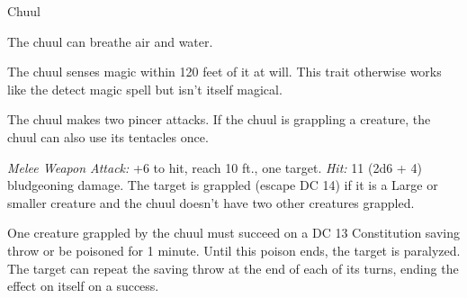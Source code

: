\documentclass[10pt,a4paper,twoside,bg=none,twocolumn,openany,nodeprecatedcode]{dndbook}
\begin{document}
\begin{DndMonster}[float=t]{Chuul}
\DndMonsterBasics[
armor-class = {16 (natural armor)},
hit-points = {\DndDice{11d10 + 33}},
speed = {30 ft., swim 30 ft.}
]
\DndMonsterAbilityScores[
 str = 19,
 dex = 10,
 con = 16,
 int = 5,
 wis = 11,
 cha = 5
]
\DndMonsterDetails[
skills = {Perception +4},
damage-immunities = {poison},
senses = {darkvision 60 ft., passive perception 14},
languages = {understands Deep Speech but can't speak},
challenge = 4,
]
The chuul can breathe air and water.

The chuul senses magic within 120 feet of it at will. This trait otherwise works like the detect magic spell but isn't itself magical.

\par
{}
The chuul makes two pincer attacks. If the chuul is grappling a creature, the chuul can also use its tentacles once.

\textsl{Melee Weapon Attack:} +6 to hit, reach 10 ft., one target. \textsl{Hit:} 11 (2d6 + 4) bludgeoning damage. The target is grappled (escape DC 14) if it is a Large or smaller creature and the chuul doesn't have two other creatures grappled.

One creature grappled by the chuul must succeed on a DC 13 Constitution saving throw or be poisoned for 1 minute. Until this poison ends, the target is paralyzed. The target can repeat the saving throw at the end of each of its turns, ending the effect on itself on a success.

\end{DndMonster}
\end{document}
